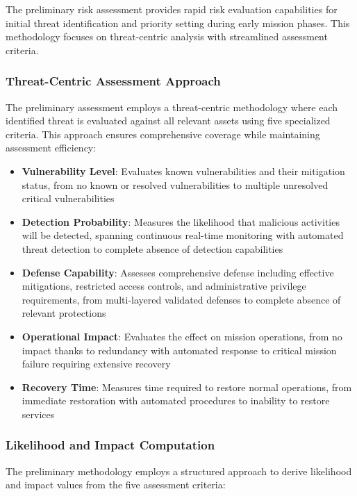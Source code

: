 \documentclass[binding=0.6cm]{sapthesis}
\begin{document}
The preliminary risk assessment provides rapid risk evaluation capabilities for initial threat identification and priority setting during early mission phases. This methodology focuses on threat-centric analysis with streamlined assessment criteria.

\subsubsection{Threat-Centric Assessment Approach}

The preliminary assessment employs a threat-centric methodology where each identified threat is evaluated against all relevant assets using five specialized criteria. This approach ensures comprehensive coverage while maintaining assessment efficiency:

\begin{itemize}
    \item \textbf{Vulnerability Level}: Evaluates known vulnerabilities and their mitigation status, from no known or resolved vulnerabilities to multiple unresolved critical vulnerabilities
    \item \textbf{Detection Probability}: Measures the likelihood that malicious activities will be detected, spanning continuous real-time monitoring with automated threat detection to complete absence of detection capabilities
    \item \textbf{Defense Capability}: Assesses comprehensive defense including effective mitigations, restricted access controls, and administrative privilege requirements, from multi-layered validated defenses to complete absence of relevant protections
    \item \textbf{Operational Impact}: Evaluates the effect on mission operations, from no impact thanks to redundancy with automated response to critical mission failure requiring extensive recovery
    \item \textbf{Recovery Time}: Measures time required to restore normal operations, from immediate restoration with automated procedures to inability to restore services
\end{itemize}

\subsubsection{Likelihood and Impact Computation}

The preliminary methodology employs a structured approach to derive likelihood and impact values from the five assessment criteria:
\end{document}
